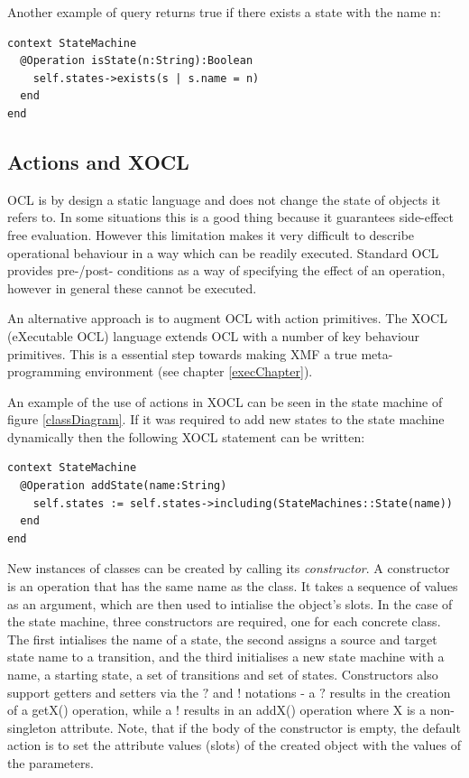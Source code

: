 \noindent Another example of query returns true if there exists a
state with the name n:

\begin{lstlisting}
context StateMachine
  @Operation isState(n:String):Boolean
    self.states->exists(s | s.name = n)
  end
end
\end{lstlisting}\subsection{Actions and XOCL}

OCL is by design a static language and does not change the state
of objects it refers to.  In some situations this is a good thing
because it guarantees side-effect free evaluation.  However this
limitation makes it very difficult to describe operational
behaviour in a way which can be readily executed.  Standard OCL
provides pre-/post- conditions as a way of specifying the effect
of an operation, however in general these cannot be executed.

An alternative approach is to augment OCL with action primitives.
The XOCL (eXecutable OCL) language extends OCL with a number of
key behaviour primitives. This is a essential step towards making
XMF a true meta-programming environment (see chapter
\ref{execChapter}).

An example of the use of actions in XOCL can be seen in the state
machine of figure \ref{classDiagram}. If it was required to add
new states to the state machine dynamically then the following
XOCL statement can be written:

\begin{lstlisting}
context StateMachine
  @Operation addState(name:String)
    self.states := self.states->including(StateMachines::State(name))
  end
end
\end{lstlisting}New instances of classes can be created by calling its {\em
constructor}. A constructor is an operation that has the same name
as the class. It takes a sequence of values as an argument, which
are then used to intialise the object's slots. In the case of the
state machine, three constructors are required, one for each
concrete class. The first intialises the name of a state, the
second assigns a source and target state name to a transition, and
the third initialises a new state machine with a name, a starting
state, a set of transitions and set of states. Constructors also
support getters and setters via the $?$ and $!$ notations - a $?$
results in the creation of a getX() operation, while a $!$ results
in an addX() operation where X is a non-singleton attribute. Note,
that if the body of the constructor is empty, the default action
is to set the attribute values (slots) of the created object with
the values of the parameters.


